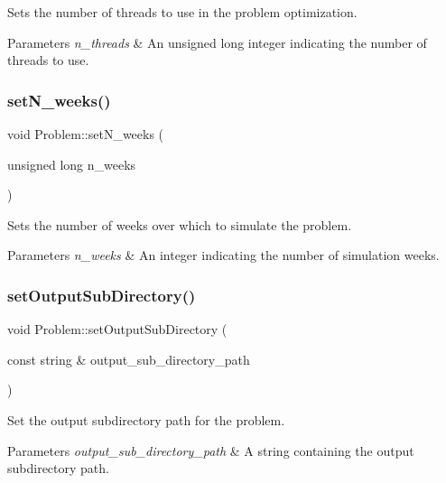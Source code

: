 Sets the number of threads to use in the problem optimization. 


\begin{DoxyParams}{Parameters}
{\em n\+\_\+threads} & An unsigned long integer indicating the number of threads to use. \\
\hline
\end{DoxyParams}
\mbox{\label{classProblem_a1ea4a3d52209fa3f284a4060fb6fa3ab}} 
\subsubsection{\texorpdfstring{set\+N\+\_\+weeks()}{setN\_weeks()}}
{\footnotesize\ttfamily void Problem\+::set\+N\+\_\+weeks (\begin{DoxyParamCaption}\item[{unsigned long}]{n\+\_\+weeks }\end{DoxyParamCaption})}



Sets the number of weeks over which to simulate the problem. 


\begin{DoxyParams}{Parameters}
{\em n\+\_\+weeks} & An integer indicating the number of simulation weeks. \\
\hline
\end{DoxyParams}
\mbox{\label{classProblem_a5b0d5309406eb36a594836e5004e3be6}} 
\subsubsection{\texorpdfstring{set\+Output\+Sub\+Directory()}{setOutputSubDirectory()}}
{\footnotesize\ttfamily void Problem\+::set\+Output\+Sub\+Directory (\begin{DoxyParamCaption}\item[{const string \&}]{output\+\_\+sub\+\_\+directory\+\_\+path }\end{DoxyParamCaption})}



Set the output subdirectory path for the problem. 


\begin{DoxyParams}{Parameters}
{\em output\+\_\+sub\+\_\+directory\+\_\+path} & A string containing the output subdirectory path. \\
\hline
\end{DoxyParams}
\mbox{\label{classProblem_a1f055d5e57392700cab27efdd4577be9}} 
